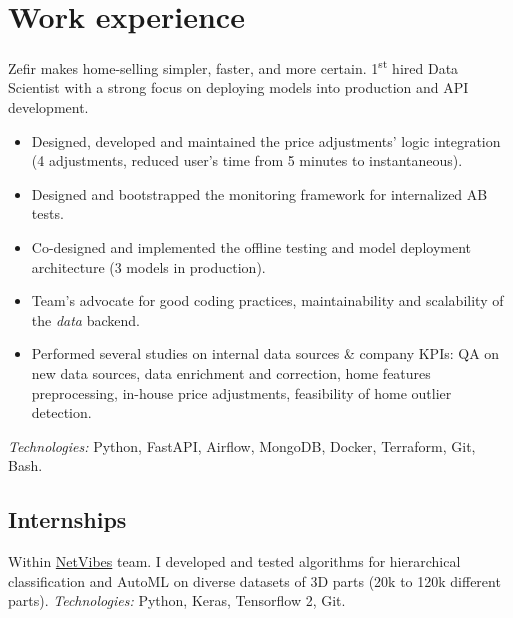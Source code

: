 \documentclass[11pt,a4paper,roman]{moderncv} %
\begin{document}
\makecvtitle
\vspace{-3em}


\section{Work experience}

    {Zefir makes home-selling simpler, faster, and more certain. 1\textsuperscript{st} hired Data Scientist with a strong focus on deploying models into production and API development.
    \begin{itemize}
        \item Designed, developed and maintained the price adjustments' logic integration (4 adjustments, reduced user's time from 5 minutes to instantaneous).
        \item Designed and bootstrapped the monitoring framework for internalized AB tests.
        \item Co-designed and implemented the offline testing and model deployment architecture (3 models in production).
        \item Team's advocate for good coding practices, maintainability and scalability of the \textit{data} backend.
        \item Performed several studies on internal data sources \& company KPIs: QA on new data sources, data enrichment and correction, home features preprocessing, in-house price adjustments, feasibility of home outlier detection.
    \end{itemize}
    \textit{Technologies:} Python, FastAPI, Airflow, MongoDB, Docker, Terraform, Git, Bash.}


\subsection{Internships}
    {Within \href{https://www.netvibes.com/en}{NetVibes} team. I developed and tested algorithms for hierarchical classification and AutoML on diverse datasets of 3D parts (20k to 120k different parts). \textit{Technologies:} Python, Keras, Tensorflow 2, Git.}
    
\end{document}

